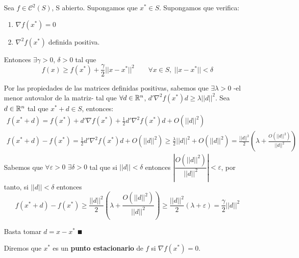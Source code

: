 \documentclass[MIOP.tex]{subfiles}
\begin{document}
\begin{teorema}[C. S.] Sea $f\in \mathcal{C}^2(S)$, S abierto. Supongamos que $x^*\in S$. Supongamos que verifica:
\begin{enumerate}
\item $\nabla f(x^*)=0$
\item $\nabla^2 f(x^*)$ definida positiva.
\end{enumerate}
Entonces $\exists \gamma>0$, $\delta>0$ tal que 
\[
f(x)\geq f(x^*)+\frac{\gamma}{2}||x-x^*||^2 \qquad \forall x\in S,\; ||x-x^*||<\delta
\]
\end{teorema}
\begin{dem}
Por las propiedades de las matrices definidas positivas, sabemos que $\exists \lambda>0$ -el menor autovalor de la matriz- tal que $\forall d\in \mathbb{R}^n$, $d'\nabla^2 f(x^*) d\geq \lambda ||d||^2$. Sea $d\in \mathbb{R}^n$ tal que $x^*+d \in S$, entonces:
\begin{gather*}
f(x^*+d)=f(x^*)+d'\nabla f(x^*) +\frac{1}{2}d'\nabla^2 f(x^*)d+O(||d||^2) \\
f(x^*+d)-f(x^*) =  \frac{1}{2}d'\nabla^2 f(x^*)d+O(||d||^2) \geq  \frac{\lambda}{2}||d||^2 + O(||d||^2) = \frac{||d||^2}{2}\left(\lambda+\frac{O(||d||^2)}{||d||^2}\right)
\end{gather*}
Sabemos que $\forall \varepsilon>0$ $\exists \delta >0$ tal que si $||d||<\delta$ entonces $\left|\dfrac{O(||d||^2)}{||d||^2}\right|<\varepsilon$, por tanto, si $||d||<\delta$ entonces
\[
f(x^*+d)-f(x^*)\geq  \frac{||d||^2}{2}\left(\lambda+\frac{O(||d||^2)}{||d||^2}\right) \geq  \frac{||d||^2}{2}\left(\lambda+\varepsilon\right) =  \frac{\gamma}{2}||d||^2 \]

Basta tomar $d=x-x^*$ $\QED$ 
\end{dem}

\begin{defi}
Diremos que $x^*$ es un \textbf{punto estacionario} de $f$ si $\nabla f(x^*)=0$. 
\end{defi}
\end{document}
